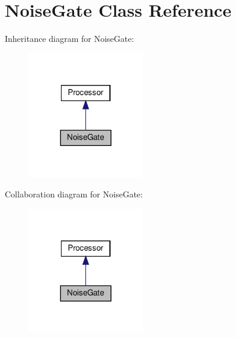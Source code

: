\hypertarget{classNoiseGate}{}\section{Noise\+Gate Class Reference}
\label{classNoiseGate}


Inheritance diagram for Noise\+Gate\+:
\nopagebreak
\begin{figure}[H]
\begin{center}
\leavevmode
\includegraphics[width=143pt]{d5/d39/classNoiseGate__inherit__graph}
\end{center}
\end{figure}


Collaboration diagram for Noise\+Gate\+:
\nopagebreak
\begin{figure}[H]
\begin{center}
\leavevmode
\includegraphics[width=143pt]{d8/da9/classNoiseGate__coll__graph}
\end{center}
\end{figure}

